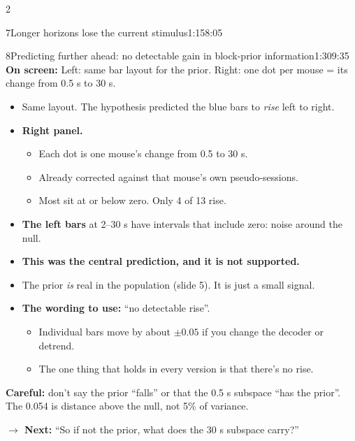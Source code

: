 \documentclass[10pt]{article}
\newcommand{\point}[1]{{\color{ink}\textbf{On screen:} #1}\par}
\newcommand{\avoid}[1]{\par{\color{warn}\textbf{Careful:} #1}\par}
\newcommand{\bridge}[1]{\par{\color{accent}\textbf{$\rightarrow$ Next:} #1}\par}
\begin{document}
\begin{multicols}{2}
\begin{slidebox}{7}{Longer horizons lose the current stimulus}{1:15}{8:05}
\end{slidebox}
\begin{slidebox}{8}{Predicting further ahead: no detectable gain in block-prior information}{1:30}{9:35}
\point{Left: same bar layout for the prior. Right: one dot per mouse = its change from 0.5 s to 30 s.}
\begin{itemize}
\item Same layout. The hypothesis predicted the blue bars to \emph{rise} left to right.
\item \textbf{Right panel.}
  \begin{itemize}
  \item Each dot is one mouse's change from 0.5 to 30 s.
  \item Already corrected against that mouse's own pseudo-sessions.
  \item Most sit at or below zero. Only 4 of 13 rise.
  \end{itemize}
\item \textbf{The left bars} at 2--30 s have intervals that include zero: noise around the null.
\item \textbf{This was the central prediction, and it is not supported.}
\item The prior \emph{is} real in the population (slide 5). It is just a small signal.
\item \textbf{The wording to use:} ``no detectable rise''.
  \begin{itemize}
  \item Individual bars move by about $\pm0.05$ if you change the decoder or detrend.
  \item The one thing that holds in every version is that there's no rise.
  \end{itemize}
\end{itemize}
\avoid{don't say the prior ``falls'' or that the 0.5 s subspace ``has the prior''. The 0.054 is distance above the null,
not 5\% of variance.}
\bridge{``So if not the prior, what does the 30 s subspace carry?''}


\end{slidebox}
\end{multicols}
\end{document}
